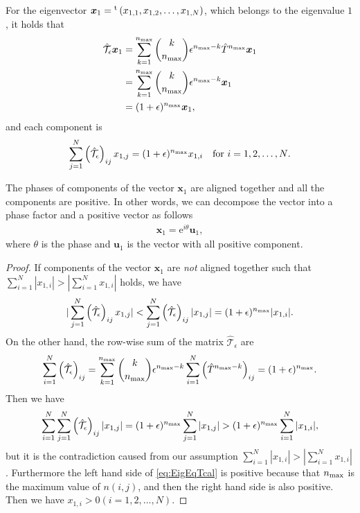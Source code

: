 For the eigenvector $\bm{x}_{1}={}^{\rm t}\left(x_{1,1},x_{1,2},\dots,x_{1,N}\right)$, which belongs to the eigenvalue $1$, it holds that
\begin{align}
\hat{\mathcal{T}}_{\epsilon}\bm{x}_{1} &= \sum_{k=1}^{n_{\rm max}}\binom{k}{n_{\rm max}}\epsilon^{n_{\rm max}-k}\hat{T}^{n_{\rm max}}\bm{x}_{1}\\
&= \sum_{k=1}^{n_{\rm max}}\binom{k}{n_{\rm max}}\epsilon^{n_{\rm max}-k}\bm{x}_{1}\\
&= (1+\epsilon)^{n_{\rm max}}\bm{x}_{1},
\end{align}
and each component is
\begin{align}
\sum_{j=1}^{N}\left(\hat{\mathcal{T}}_{\epsilon}\right)_{ij}x_{1,j} = (1+\epsilon)^{n_{\rm max}}x_{1,i}\quad\text{for $i=1,2,\dots,N$}\label{eq:EigEqTcal}.
\end{align}

\begin{theorem}
	The phases of components of the vector $\bm{x}_{1}$ are aligned together and all the components are positive. In other words, we can decompose the vector into a phase factor and a positive vector as follows
	\begin{align}
	\bm{x}_{1} = \mathrm{e}^{i\theta}\bm{u}_{1},
	\end{align}
	where $\theta$ is the phase and $\bm{u}_{1}$ is the vector with all positive component.
\end{theorem}

\begin{proof}
	If components of the vector $\bm{x}_{1}$ are \textit{not} aligned together such that $\sum_{i=1}^{N}|x_{1,i}|>|\sum_{i=1}^{N}x_{1,i}|$ holds, we have
	\begin{align}
	|\sum_{j=1}^{N}\left(\hat{\mathcal{T}}_{\epsilon}\right)_{ij}x_{1,j}| < \sum_{j=1}^{N}\left(\hat{\mathcal{T}}_{\epsilon}\right)_{ij}|x_{1,j}| = (1+\epsilon)^{n_{\rm max}}|x_{1,i}|.
	\end{align}
	On the other hand, the row-wise sum of the matrix $\hat{\mathcal{T}}_{\epsilon}$ are
	\begin{align}
	\sum_{i=1}^{N}\left(\hat{\mathcal{T}}_{\epsilon}\right)_{ij} = \sum_{k=1}^{n_{\rm max}}\binom{k}{n_{\rm max}}\epsilon^{n_{\rm max}-k}\sum_{i=1}^{N}\left(\hat{T}^{n_{\rm max}-k}\right)_{ij} = (1+\epsilon)^{n_{\rm max}}.
	\end{align}
	Then we have
	\begin{align}
	\sum_{i=1}^{N}\sum_{j=1}^{N}\left(\hat{\mathcal{T}}_{\epsilon}\right)_{ij}|x_{1,j}| = (1+\epsilon)^{n_{\rm max}}\sum_{j=1}^{N}|x_{1,j}| > (1+\epsilon)^{n_{\rm max}}\sum_{i=1}^{N}|x_{1,i}|,
	\end{align}
	but it is the contradiction caused from our assumption $\sum_{i=1}^{N}|x_{1,i}|>|\sum_{i=1}^{N}x_{1,i}|$. Furthermore the left hand side of \eqref{eq:EigEqTcal} is positive because that $n_{\rm max}$ is the maximum value of $n(i,j)$, and then the right hand side is also positive. Then we have $x_{1,i}>0(i=1,2,\dots,N)$.
\end{proof}

